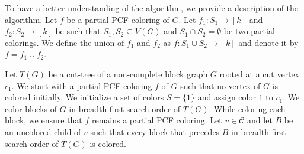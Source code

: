 \documentclass[11pt]{article}
\theoremstyle{plain}
\begin{document}
	\medskip
	
	To have a better understanding of the algorithm, we provide a description of the algorithm. Let $f$ be a partial PCF coloring of $G$. 
	Let $f_1:S_1 \to [k]$ and $f_2:S_2 \to [k]$ be such that $S_1, S_2\subseteq V(G)$ and $S_1\cap S_2=\emptyset$ be two partial colorings.
	We define the union of $f_1$ and $f_2$ as $f:S_1\cup S_2\to[k]$ and denote it by $f = f_1\cup f_2$.
	
	\medskip
	
	Let $T(G)$ be a cut-tree of a non-complete block graph $G$ rooted at a cut vertex $c_1$. We start with a partial PCF coloring $f$ of $G$ such that no vertex of $G$ is colored initially.
	We initialize a set of colors $S = \{1\}$ and assign color $1$ to $c_1$. We color blocks of $G$ in breadth first search order of $T(G)$. While coloring each block, we ensure that $f$ remains a partial PCF coloring. 
	Let $v\in \mathcal{C}$ and let $B$ be an uncolored child of $v$ such that every block that precedes $B$ in breadth first search order of $T(G)$ is colored. 
	
\end{document}
